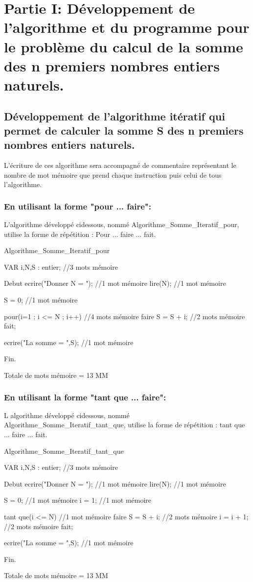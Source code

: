 \documentclass[•]{article}
\begin{document}
\def\reportnumber{1}
\def\reporttitle{Mesure du temps d'exécution d'un programme.}


\section{Partie I: Développement de l'algorithme et du programme pour le problème du calcul de la somme des n premiers nombres entiers naturels.}

\subsection{Développement de l'algorithme itératif qui permet de calculer la somme S des n premiers nombres entiers naturels.}
\textrm{L'écriture de ces algorithme sera accompagné de commentaire représentant le nombre de mot mémoire que prend chaque instruction puis celui de tous l'algorithme.}  

\subsubsection{En utilisant la forme "pour ... faire":}
\textrm{L'algorithme développé ci\-dessous, nommé Algorithme\_Somme\_Iteratif\_pour, utilise la forme de répétition : Pour ... faire ... fait.}
\begin{sql}

  Algorithme_Somme_Iteratif_pour
 
 VAR
 i,N,S : entier;				//3 mots mémoire
 
 Debut
	ecrire("Donner N = ");		//1 mot mémoire
	lire(N);					//1 mot mémoire
	
	S = 0;						//1 mot mémoire
	
	pour(i=1 ; i <= N ; i++)	//4 mots mémoire
	  faire
		S = S + i;				//2 mots mémoire
	  fait;
	  
	ecrire("La somme = ",S);	//1 mot mémoire
	
 Fin.
\end{sql}
\textrm{Totale de mots mémoire = 13 MM}

\subsubsection{En utilisant la forme "tant que ... faire":}
\textrm{L algorithme développé ci\-dessous, nommé Algorithme\_Somme\_Iteratif\_tant\_que, utilise la forme de répétition : tant que ... faire ... fait.}
\begin{sql}

 Algorithme_Somme_Iteratif_tant_que
 
 VAR
 i,N,S : entier;				//3 mots mémoire
 
 Debut
	ecrire("Donner N = ");		//1 mot mémoire
	lire(N);					//1 mot mémoire
	
	S = 0;						//1 mot mémoire
	i = 1;						//1 mot mémoire
	
	tant que(i <= N)			//1 mot mémoire
	  faire
		S = S + i;				//2 mots mémoire
		i = i + 1;				//2 mots mémoire
	  fait;
	  
	ecrire("La somme = ",S);	//1 mot mémoire
	
 Fin.
\end{sql}
\textrm{Totale de mots mémoire = 13 MM}
\end{document}
